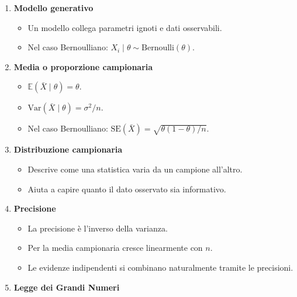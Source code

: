 \documentclass[
  italian,
  letterpaper,
  a4paper,
  11pt,
  open=any]{scrbook}
\providecommand{\tightlist}{%
  \setlength{\itemsep}{0pt}\setlength{\parskip}{0pt}}
\theoremstyle{plain}
\theoremstyle{definition}
\theoremstyle{definition}
\theoremstyle{remark}
\begin{document}

\begin{tcolorbox}[enhanced jigsaw, arc=.35mm, bottomrule=.15mm, bottomtitle=1mm, breakable, colback=white, colbacktitle=quarto-callout-important-color!10!white, colframe=quarto-callout-important-color-frame, coltitle=black, left=2mm, leftrule=.75mm, opacityback=0, opacitybacktitle=0.6, rightrule=.15mm, title=\textcolor{quarto-callout-important-color}{\faExclamation}\hspace{0.5em}{Importante}, titlerule=0mm, toprule=.15mm, toptitle=1mm]

\begin{enumerate}
\def\labelenumi{\arabic{enumi}.}
\tightlist
\item
  \textbf{Modello generativo}

  \begin{itemize}
  \tightlist
  \item
    Un modello collega parametri ignoti e dati osservabili.
  \item
    Nel caso Bernoulliano:
    \(X_i \mid \theta \sim \text{Bernoulli}(\theta)\).
  \end{itemize}
\item
  \textbf{Media o proporzione campionaria}

  \begin{itemize}
  \tightlist
  \item
    \(\mathbb{E}(\bar{X} \mid \theta)=\theta\).
  \item
    \(\text{Var}(\bar{X} \mid \theta)=\sigma^2/n\).
  \item
    Nel caso Bernoulliano:
    \(\text{SE}(\bar{X})=\sqrt{\theta(1-\theta)/n}\).
  \end{itemize}
\item
  \textbf{Distribuzione campionaria}

  \begin{itemize}
  \tightlist
  \item
    Descrive come una statistica varia da un campione all'altro.
  \item
    Aiuta a capire quanto il dato osservato sia informativo.
  \end{itemize}
\item
  \textbf{Precisione}

  \begin{itemize}
  \tightlist
  \item
    La precisione è l'inverso della varianza.
  \item
    Per la media campionaria cresce linearmente con \(n\).
  \item
    Le evidenze indipendenti si combinano naturalmente tramite le
    precisioni.
  \end{itemize}
\item
  \textbf{Legge dei Grandi Numeri}


\end{enumerate}
\end{tcolorbox}
\end{document}
